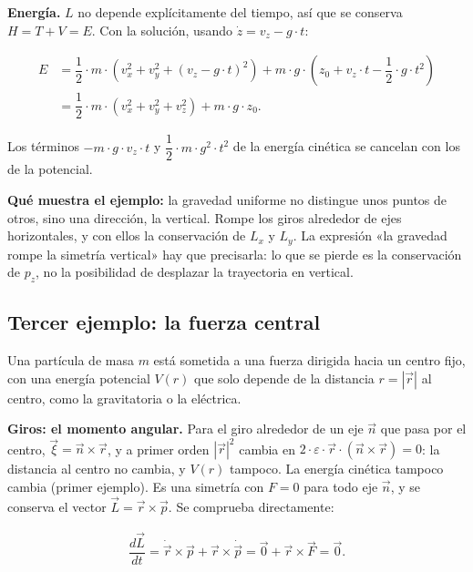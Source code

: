 \documentclass[11pt,a4paper,spanish]{book}
\begin{document}
\textbf{Energía.} \(L\) no depende explícitamente del tiempo, así que se
conserva \(H = T + V = E\). Con la solución, usando
\(\dot{z} = v_z - g \cdot t\):

\[
\begin{aligned}
E &= \dfrac{1}{2} \cdot m \cdot \left(v_x^2 + v_y^2 + (v_z - g \cdot t)^2\right) + m \cdot g \cdot \left(z_0 + v_z \cdot t - \dfrac{1}{2} \cdot g \cdot t^2\right) \\
&= \dfrac{1}{2} \cdot m \cdot (v_x^2 + v_y^2 + v_z^2) + m \cdot g \cdot z_0.
\end{aligned}
\]

Los términos \(-m \cdot g \cdot v_z \cdot t\) y
\(\dfrac{1}{2} \cdot m \cdot g^2 \cdot t^2\) de la energía cinética se
cancelan con los de la potencial.

\textbf{Qué muestra el ejemplo:} la gravedad uniforme no distingue unos
puntos de otros, sino una dirección, la vertical. Rompe los giros
alrededor de ejes horizontales, y con ellos la conservación de \(L_x\) y
\(L_y\). La expresión «la gravedad rompe la simetría vertical» hay que
precisarla: lo que se pierde es la conservación de \(p_z\), no la
posibilidad de desplazar la trayectoria en vertical.

\subsection{Tercer ejemplo: la fuerza
central}\label{tercer-ejemplo-la-fuerza-central}

Una partícula de masa \(m\) está sometida a una fuerza dirigida hacia un
centro fijo, con una energía potencial \(V(r)\) que solo depende de la
distancia \(r = |\vec{r}|\) al centro, como la gravitatoria o la
eléctrica.

\textbf{Giros: el momento angular.} Para el giro alrededor de un eje
\(\vec{n}\) que pasa por el centro,
\(\vec{\xi} = \vec{n} \times \vec{r}\), y a primer orden \(|\vec{r}|^2\)
cambia en
\(2 \cdot \varepsilon \cdot \vec{r} \cdot (\vec{n} \times \vec{r}) = 0\):
la distancia al centro no cambia, y \(V(r)\) tampoco. La energía
cinética tampoco cambia (primer ejemplo). Es una simetría con \(F = 0\)
para todo eje \(\vec{n}\), y se conserva el vector
\(\vec{L} = \vec{r} \times \vec{p}\). Se comprueba directamente:

\[
\begin{aligned}
\dfrac{d\vec{L}}{dt} = \dot{\vec{r}} \times \vec{p} + \vec{r} \times \dot{\vec{p}} = \vec{0} + \vec{r} \times \vec{F} = \vec{0}.
\end{aligned}
\]
\end{document}
